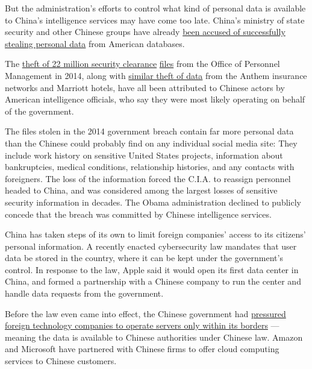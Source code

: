 But the administration's efforts to control what kind of personal data
is available to China's intelligence services may have come too late.
China's ministry of state security and other Chinese groups have already
\href{https://www.nytimes.com/2018/12/20/us/politics/us-and-other-nations-to-announce-china-crackdown.html}{been
accused of successfully stealing personal data} from American databases.

The
\href{https://www.nytimes.com/2015/06/05/us/breach-in-a-federal-computer-system-exposes-personnel-data.html}{theft
of 22 million security clearance}
\href{https://www.nytimes.com/2015/06/05/us/breach-in-a-federal-computer-system-exposes-personnel-data.html}{files}
from the Office of Personnel Management in 2014, along with
\href{https://www.nytimes.com/2018/12/11/us/politics/trump-china-trade.html}{similar
theft of data} from the Anthem insurance networks and Marriott hotels,
have all been attributed to Chinese actors by American intelligence
officials, who say they were most likely operating on behalf of the
government.

The files stolen in the 2014 government breach contain far more personal
data than the Chinese could probably find on any individual social media
site: They include work history on sensitive United States projects,
information about bankruptcies, medical conditions, relationship
histories, and any contacts with foreigners. The loss of the information
forced the C.I.A. to reassign personnel headed to China, and was
considered among the largest losses of sensitive security information in
decades. The Obama administration declined to publicly concede that the
breach was committed by Chinese intelligence services.

China has taken steps of its own to limit foreign companies' access to
its citizens' personal information. A recently enacted cybersecurity law
mandates that user data be stored in the country, where it can be kept
under the government's control. In response to the law, Apple said it
would open its first data center in China, and formed a partnership with
a Chinese company to run the center and handle data requests from the
government.

Before the law even came into effect, the Chinese government had
\href{https://www.nytimes.com/2017/07/12/business/apple-china-data-center-cybersecurity.html}{pressured
foreign technology companies to operate servers only within its borders}
--- meaning the data is available to Chinese authorities under Chinese
law. Amazon and Microsoft have partnered with Chinese firms to offer
cloud computing services to Chinese customers.

